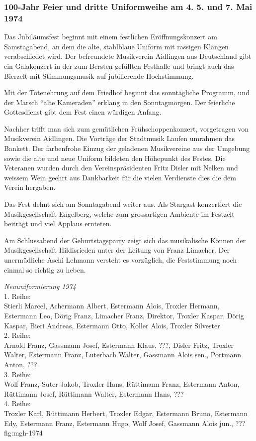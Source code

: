 \begin{history}
    \subsubsection*{100-Jahr Feier und dritte Uniformweihe am 4. 5. und 7. Mai 1974}

    Das Jubiläumsfest beginnt mit einem festlichen Eröffnungskonzert am
    Samstagabend, an dem die alte, stahlblaue Uniform mit rassigen Klängen
    verabschiedet wird. Der befreundete Musikverein Aidlingen aus Deutschland
    gibt ein Galakonzert in der zum Bersten gefüllten Festhalle und bringt auch
    das Bierzelt mit Stimmungsmusik auf jubilierende Hochstimmung.

    Mit der Totenehrung auf dem Friedhof beginnt das sonntägliche Programm, und
    der Marsch \enquote{alte Kameraden} erklang in den Sonntagmorgen. Der
    feierliche Gottesdienst gibt dem Fest einen würdigen Anfang.

    Nachher trifft man sich zum gemütlichen Frühschoppenkonzert, vorgetragen von
    Musikverein Aidlingen. Die Vorträge der Stadtmusik Laufen umrahmen das
    Bankett. Der farbenfrohe Einzug der geladenen Musikvereine aus der Umgebung
    sowie die alte und neue Uniform bildeten den Höhepunkt des Festes. Die
    Veteranen wurden durch den Vereinspräsidenten Fritz Disler mit Nelken und
    weissem Wein geehrt aus Dankbarkeit für die vielen Verdienste dies die dem
    Verein hergaben.

    Das Fest dehnt sich am Sonntagabend weiter aus. Als Stargast konzertiert die
    Musikgesellschaft Engelberg, welche zum grossartigen Ambiente im Festzelt
    beiträgt und viel Applaus ernteten.

    Am Schlussabend der Geburtstagsparty zeigt sich das musikalische Können der
    Musikgesellschaft Hildisrieden unter der Leitung von Franz Limacher. Der
    unermüdliche Aschi Lehmann versteht es vorzüglich, die Feststimmung noch
    einmal so richtig zu heben.

\end{history}

{\emph{Neuuniformierung 1974}\\
    1. Reihe:\\
    Stierli Marcel, Achermann Albert, Estermann Alois, Troxler Hermann,
    Estermann Leo, Dörig Franz, Limacher Franz, Direktor, Troxler Kaspar, Dörig
    Kaspar, Bieri Andreas, Estermann Otto, Koller Alois, Troxler Silvester\\
    2. Reihe:\\
    Arnold Franz, Gassmann Josef, Estermann Klaus, ???, Disler Fritz, Troxler Walter,
    Estermann Franz, Luterbach Walter, Gassmann Alois sen., Portmann Anton, ???\\
    3. Reihe:\\
    Wolf Franz, Suter Jakob, Troxler Hans, Rüttimann Franz, Estermann Anton,
    Rüttimann Josef, Rüttimann Walter, Estermann Hans, ???\\
    4. Reihe:\\
    Troxler Karl, Rüttimann Herbert, Troxler Edgar, Estermann Bruno, Estermann Edy,
    Estermann Franz, Estermann Hugo, Wolf Josef, Gassmann Alois jun., ??? } {fig:mgh-1974}